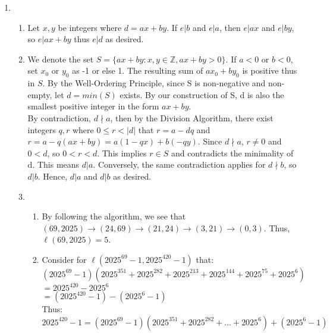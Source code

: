 \documentclass{article}
\begin{document}
\begin{enumerate}[leftmargin=*, label=\arabic*.]

  \item
  \begin{enumerate}[label=\alph*)]
        \item 
        Let $x, y$ be integers where $d = ax + by$. If $e|b$ and $e|a$, then $e|ax$ and $e|by$, so $e|ax + by$ thus $e|d$ as desired. \\ 
        
        \item 
        We denote the set $S = \{ax + by : x, y \in \mathbb{Z}, ax + by > 0\}$. If $a < 0$ or $b < 0$, set $x_0$ or $y_0$ as -1 or else 1. The resulting sum of $ax_0 + by_0$ is positive thus in $S$. By the Well-Ordering Principle, since S is non-negative and non-empty, let $d = min(S)$ exists. By our construction of S, d is also the smallest positive integer in the form $ax + by$. \\
        
        By contradiction, $d \nmid a$, then by the Division Algorithm, there exist integers $q,r$ where $0 \leq r < |d|$ that $r = a  - dq$ and $r = a - q(ax + by) = a(1-qx)+b(-qy)$. Since $d \nmid a$, $r \neq 0$ and $0 < d$, so $0 < r < d$. This implies $r \in S$ and contradicts the minimality of d. This means $d|a$. Conversely, the same contradiction applies for $d\nmid b$, so $d|b$. Hence, $d|a$ and $d|b$ as desired. 
      
  \newpage
  
  \item
  \begin{enumerate}[label=\alph*)]
        \item 
        By following the algorithm, we see that $(69, 2025) \xrightarrow{} (24, 69) \xrightarrow{} (21, 24) \xrightarrow{} (3, 21) \xrightarrow{} (0, 3)$. Thus, $\ell(69, 2025) = 5$. \\
        
        \item
        Consider for $\ell(2025^{69} - 1, 2025^{420} - 1)$ that: \\ 

        $(2025^{69} - 1)(2025^{351} + 2025^{282} + 2025^{213} + 2025^{144} + 2025^{75} + 2025^{6})$ \\
        $= 2025^{420} - 2025^{6}$\\
        $= (2025^{420} - 1) - (2025^{6} - 1)$\\

        Thus: 
        $$2025^{420} - 1 = (2025^{69} - 1)(2025^{351} + 2025^{282} + ... + 2025^6) + (2025^{6} - 1)$$


\end{enumerate}
\end{enumerate}
\end{enumerate}
\end{document}
